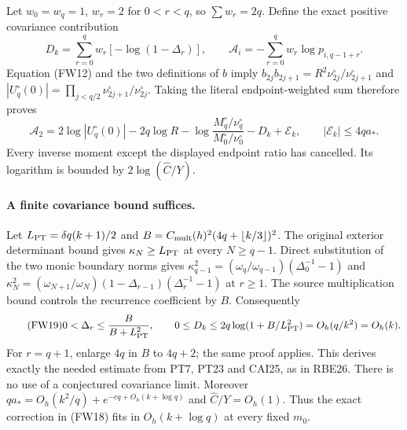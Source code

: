 \documentclass[11pt]{article}
\begin{document}
Let $w_0=w_q=1$, $w_r=2$ for $0<r<q$, so $\sum w_r=2q$.
Define the exact positive covariance contribution
\begin{equation}\tag{FW17}
 D_k=\sum_{r=0}^q w_r[-\log(1-\Delta_r)],\qquad
 \mathscr A_i=-\sum_{r=0}^q w_r\log p_{i,q-1+r}.
\end{equation}
Equation (FW12) and the two definitions of $b$ imply
$b_{2j}b_{2j+1}=R^2\nu_{2j}^\circ/\nu_{2j+1}^\circ$ and
$|U_q^\circ(0)|=\prod_{j<q/2}\nu_{2j+1}^\circ/\nu_{2j}^\circ$.
Taking the literal endpoint-weighted sum therefore proves
\begin{equation}\tag{FW18}
 \boxed{\mathscr A_2=
 2\log|U_q^\circ(0)|-2q\log R
 -\log\frac{M_q^\circ/\nu_q^\circ}{M_0^\circ/\nu_0^\circ}
 -D_k+\mathcal E_k,\qquad |\mathcal E_k|\le4qa_*.}
\end{equation}
Every inverse moment except the displayed endpoint ratio has cancelled.
Its logarithm is bounded by $2\log(\widehat C/Y)$.

\paragraph{A finite covariance bound suffices.}
Let $L_{\rm PT}=\delta q(k+1)/2$ and
$B=C_{\rm mult}(h)^2(4q+\lfloor k/3\rfloor)^2$.
The original exterior determinant bound gives $\kappa_N\ge L_{\rm PT}$
at every $N\ge q-1$. Direct substitution of the two monic boundary
norms gives
$\kappa_{q-1}^2=(\omega_q/\omega_{q-1})(\Delta_0^{-1}-1)$ and
$\kappa_N^2=(\omega_{N+1}/\omega_N)(1-\Delta_{r-1})(\Delta_r^{-1}-1)$
at $r\ge1$. The source multiplication bound controls the recurrence
coefficient by $B$. Consequently
\begin{equation}\tag{FW19}
 0<\Delta_r\le\frac{B}{B+L_{\rm PT}^2},\qquad
 0\le D_k\le2q\log(1+B/L_{\rm PT}^2)=O_h(q/k^2)=O_h(k).
\end{equation}
For $r=q+1$, enlarge $4q$ in $B$ to $4q+2$; the same proof applies.
This derives exactly the needed estimate from PT7, PT23 and CAI25,
as in RBE26. There is no use of a conjectured covariance limit.
Moreover $qa_*=O_h(k^2/q)+e^{-cq+O_h(k+\log q)}$ and
$\widehat C/Y=O_h(1)$. Thus the exact correction in (FW18) fits in
$O_h(k+\log q)$ at every fixed $m_0$.
\end{document}
